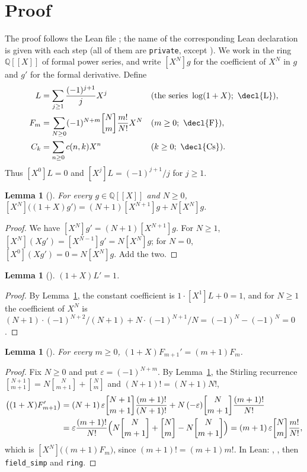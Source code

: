 \documentclass[11pt]{amsart}
\theoremstyle{plain}
\newtheorem{lemma}[theorem]{Lemma}
\theoremstyle{definition}
\newcommand{\Q}{\mathbb{Q}}
\newcommand{\st}[2]{\genfrac{[}{]}{0pt}{}{#1}{#2}}
\newcommand{\fps}{\Q[\![X]\!]}
\newcommand{\coef}[1]{[X^{#1}]}
\begin{document}
\section{Proof}\label{sec:proof}

The proof follows the Lean file ; the name of the corresponding Lean declaration is given with each step (all of them are \texttt{private}, except ).
We work in the ring $\fps$ of formal power series, and write $\coef N g$ for the coefficient of $X^N$ in $g$ and $g'$ for the formal derivative. Define
\begin{align*}
  L&=\sum_{j\ge1}\frac{(-1)^{j+1}}{j}X^j &&(\text{the series }\log(1+X);\ \text{\decl{L}}),\\
  F_m&=\sum_{N\ge0}(-1)^{N+m}\st Nm\frac{m!}{N!}X^N &&(m\ge0;\ \text{\decl{F}}),\\
  C_k&=\sum_{n\ge0}c(n,k)X^n &&(k\ge0;\ \text{\decl{Cs}}).
\end{align*}
Thus $\coef0L=0$ and $\coef jL=(-1)^{j+1}/j$ for $j\ge1$.

\begin{lemma}[]\label{lem:deriv}
For every $g\in\fps$ and $N\ge0$,
$\coef N\bigl((1+X)g'\bigr)=(N+1)\coef{N+1}g+N\coef Ng$.
\end{lemma}

\begin{proof}
We have $\coef N g'=(N+1)\coef{N+1}g$. For $N\ge1$, $\coef N(Xg')=\coef{N-1}g'=N\coef Ng$; for $N=0$, $\coef0(Xg')=0=N\coef Ng$. Add the two.
\end{proof}

\begin{lemma}[]\label{lem:L}
$(1+X)L'=1$.
\end{lemma}

\begin{proof}
By Lemma~\ref{lem:deriv}, the constant coefficient is $1\cdot\coef1L+0=1$, and for $N\ge1$ the coefficient of $X^N$ is $(N+1)\cdot(-1)^{N+2}/(N+1)+N\cdot(-1)^{N+1}/N=(-1)^N-(-1)^N=0$.
\end{proof}

\begin{lemma}[]\label{lem:F}
For every $m\ge0$, $(1+X)F_{m+1}'=(m+1)F_m$.
\end{lemma}

\begin{proof}
Fix $N\ge0$ and put $\varepsilon=(-1)^{N+m}$. By Lemma~\ref{lem:deriv}, the Stirling recurrence $\st{N+1}{m+1}=N\st N{m+1}+\st Nm$ and $(N+1)!=(N+1)N!$,
\begin{align*}
  \coef N\bigl((1+X)F_{m+1}'\bigr)
  &=(N+1)\,\varepsilon\st{N+1}{m+1}\frac{(m+1)!}{(N+1)!}+N\,(-\varepsilon)\st N{m+1}\frac{(m+1)!}{N!}\\
  &=\varepsilon\frac{(m+1)!}{N!}\Bigl(N\st N{m+1}+\st Nm-N\st N{m+1}\Bigr)
   =(m+1)\,\varepsilon\st Nm\frac{m!}{N!},
\end{align*}
which is $\coef N\bigl((m+1)F_m\bigr)$, since $(m+1)!=(m+1)m!$.
In Lean: , , then \texttt{field\_simp} and \texttt{ring}.
\end{proof}
\end{document}
